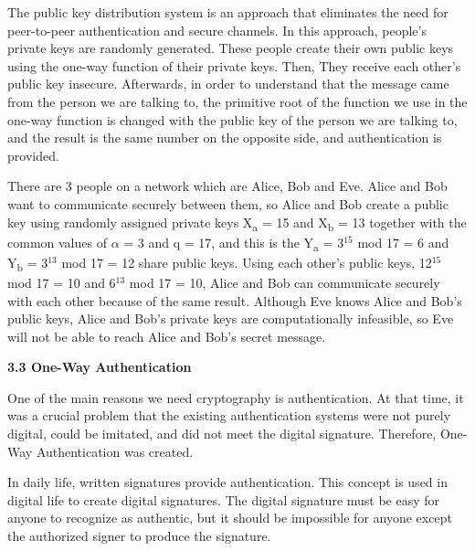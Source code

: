 \documentclass{article}
\begin{document}
\begin{flushleft}
\hspace{1cm} The public key distribution system is an approach that eliminates the need for peer-to-peer authentication and secure channels. In this approach, people's private keys are randomly generated. These people create their own public keys using the one-way function of their private keys. Then, They receive each other's public key insecure. Afterwards, in order to understand that the message came from the person we are talking to, the primitive root of the function we use in the one-way function is changed with the public key of the person we are talking to, and the result is the same number on the opposite side, and authentication is provided. \newline

\hspace{1cm} There are 3 people on a network which are Alice, Bob and Eve. Alice and Bob want to communicate securely between them, so Alice and Bob create a public key using randomly assigned private keys X\textsubscript{a} = 15 and X\textsubscript{b} = 13 together with the common values of $\alpha$ = 3 and q = 17, and this is the \hspace{1cm} Y\textsubscript{a} = 3$^{15}$ mod 17 = 6 and Y\textsubscript{b} = 3$^{13}$ mod 17 = 12 share public keys. Using each other's public keys, 12$^{15}$ mod 17 = 10 and 6$^{13}$ mod 17 = 10, Alice and Bob can communicate securely with each other because of the same result. Although Eve knows Alice and Bob's public keys, Alice and Bob's private keys are computationally infeasible, so Eve will not be able to reach Alice and Bob's secret message.\newline

\textbf{3.3 One-Way Authentication} \newline

\hspace{1cm} One of the main reasons we need cryptography is authentication. At that time, it was a crucial problem that the existing authentication systems were not purely digital, could be imitated, and did not meet the digital signature. Therefore, One-Way Authentication was created.\newline

\hspace{1cm} In daily life, written signatures provide authentication. This concept is used in digital life to create digital signatures. The digital signature must be easy for anyone to recognize as authentic, but it should be impossible for anyone except the authorized signer to produce the signature. \newline


\end{flushleft}
\end{document}
